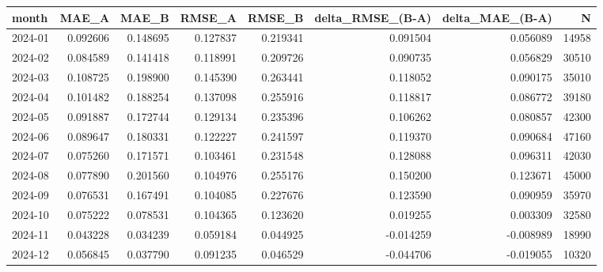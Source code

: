 \begin{tabular}{lrrrrrrr}
\toprule
month & MAE_A & MAE_B & RMSE_A & RMSE_B & delta_RMSE_(B-A) & delta_MAE_(B-A) & N \\
\midrule
2024-01 & 0.092606 & 0.148695 & 0.127837 & 0.219341 & 0.091504 & 0.056089 & 14958 \\
2024-02 & 0.084589 & 0.141418 & 0.118991 & 0.209726 & 0.090735 & 0.056829 & 30510 \\
2024-03 & 0.108725 & 0.198900 & 0.145390 & 0.263441 & 0.118052 & 0.090175 & 35010 \\
2024-04 & 0.101482 & 0.188254 & 0.137098 & 0.255916 & 0.118817 & 0.086772 & 39180 \\
2024-05 & 0.091887 & 0.172744 & 0.129134 & 0.235396 & 0.106262 & 0.080857 & 42300 \\
2024-06 & 0.089647 & 0.180331 & 0.122227 & 0.241597 & 0.119370 & 0.090684 & 47160 \\
2024-07 & 0.075260 & 0.171571 & 0.103461 & 0.231548 & 0.128088 & 0.096311 & 42030 \\
2024-08 & 0.077890 & 0.201560 & 0.104976 & 0.255176 & 0.150200 & 0.123671 & 45000 \\
2024-09 & 0.076531 & 0.167491 & 0.104085 & 0.227676 & 0.123590 & 0.090959 & 35970 \\
2024-10 & 0.075222 & 0.078531 & 0.104365 & 0.123620 & 0.019255 & 0.003309 & 32580 \\
2024-11 & 0.043228 & 0.034239 & 0.059184 & 0.044925 & -0.014259 & -0.008989 & 18990 \\
2024-12 & 0.056845 & 0.037790 & 0.091235 & 0.046529 & -0.044706 & -0.019055 & 10320 \\
\bottomrule
\end{tabular}
